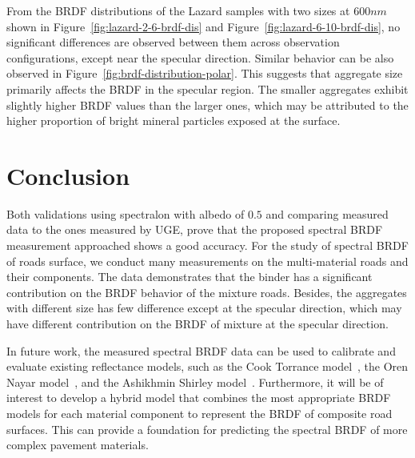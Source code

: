 From the BRDF distributions of the Lazard samples with two sizes at $600 nm$ shown in Figure~\ref{fig:lazard-2-6-brdf-dis} and Figure~\ref{fig:lazard-6-10-brdf-dis}, no significant differences are observed between them across observation configurations, except near the specular direction. 
Similar behavior can be also observed in Figure~\ref{fig:brdf-distribution-polar}. 
This suggests that aggregate size primarily affects the BRDF in the specular region. 
The smaller aggregates exhibit slightly higher BRDF values than the larger ones, which may be attributed to the higher proportion of bright mineral particles exposed at the surface.



\section{Conclusion}
\label{sec: conclusion}


Both validations using spectralon with albedo of $0.5$ and comparing measured data to the ones measured by UGE, prove that the proposed spectral BRDF measurement approached shows a good accuracy.
For the study of spectral BRDF of roads surface, we conduct many measurements on the multi-material roads and their components.
The data demonstrates that the binder has a significant contribution on the BRDF behavior of the mixture roads.
Besides, the aggregates with different size has few difference except at the specular direction, which may have different contribution on the BRDF of mixture at the specular direction.



In future work, the measured spectral BRDF data can be used to calibrate and evaluate existing reflectance models, such as the Cook Torrance model~\cite{1982_Cook}, the Oren Nayar model~\cite{1995_Oren}, and the Ashikhmin Shirley model~\cite{2000_Ashikhmin}. 
Furthermore, it will be of interest to develop a hybrid model that combines the most appropriate BRDF models for each material component to represent the BRDF of composite road surfaces.
This can provide a foundation for predicting the spectral BRDF of more complex pavement materials.
